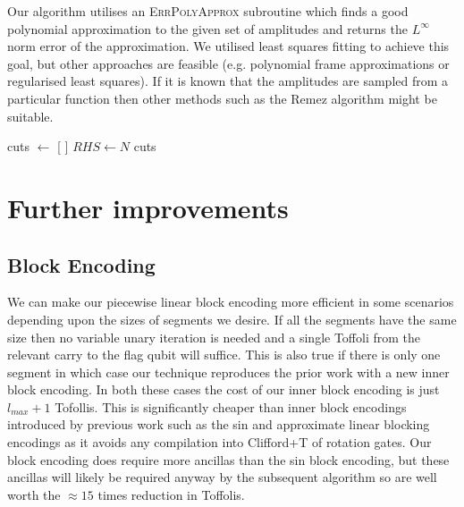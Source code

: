 \documentclass[a4paper,twocolumn,,accepted=2025-05-27]{quantumarticle}
\theoremstyle{empty}
\begin{document}
Our algorithm utilises an \textsc{\footnotesize ErrPolyApprox} subroutine which finds a good polynomial approximation to the given set of amplitudes and returns the $L^\infty$ norm error of the approximation. We utilised least squares fitting to achieve this goal, but other approaches are feasible (e.g. polynomial frame approximations or regularised least squares). If it is known that the amplitudes are sampled from a particular function then other methods such as the Remez algorithm might be suitable.
\begin{algorithm}[hbtp]
\caption{Performs at most $N\log_2 N$ queries to \textsc{ErrPolyApprox} and returns the optimal cuts between the pieces of the polynomial}
\label{alg:piecewise_classical_approx}

cuts $\gets$ [ ]\;
$RHS \gets N$\;
\Return cuts\;
\end{algorithm}
\section{Further improvements}
\subsection{Block Encoding}
\label{section:improve-be}We can make our piecewise linear block encoding more efficient in some scenarios depending upon the sizes of segments we desire. If all the segments have the same size then no variable unary iteration is needed and a single Toffoli from the relevant carry to the flag qubit will suffice. This is also true if there is only one segment in which case our technique reproduces the prior work \cite{mcardleQuantumStatePreparation2022} with a new inner block encoding. In both these cases the cost of our inner block encoding is just $l_{max} + 1$ Tofollis. This is significantly cheaper than inner block encodings introduced by previous work such as the sin \cite{mcardleQuantumStatePreparation2022} and approximate linear \cite{Gonzalez-Conde:2023fjg} blocking encodings as it avoids any compilation into Clifford+T of rotation gates\footnotemark[3]. Our block encoding does require more ancillas than the sin block encoding, but these ancillas will likely be required anyway by the subsequent algorithm so are well worth the $\approx 15$ times reduction in Toffolis.
\end{document}

